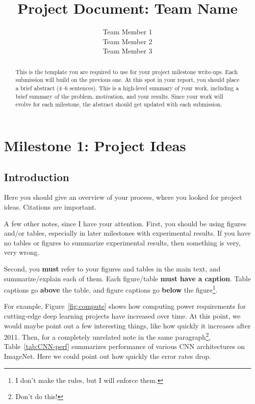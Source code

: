 \documentclass{report}
\title{Project Document: Team Name}
\author{Team Member 1 \\
Team Member 2 \\
Team Member 3 }
\date{}
\begin{document}
\maketitle

\tableofcontents

\begin{abstract}
This is the template you are required to use for your project milestone write-ups.  Each submission will build on the previous one.  At this spot in your report, you should place a brief abstract (4--6 sentences). This is a high-level summary of your work, including a brief summary of the problem, motivation, and your results.  Since your work will evolve for each milestone, the abstract should get updated with each submission.
\end{abstract}

\chapter{Milestone 1: Project Ideas}

\section{Introduction}

Here you should give an 
overview of your process, where you looked for project ideas. Citations are important. 

A few other notes, since I have your attention. First, you should be using figures and/or tables, especially in later milestones with experimental results.  If you have no tables or figures to summarize experimental results, then something is very, very wrong. 

Second, you {\bf must} refer to your figures and tables in the main text, and summarize/explain each of  them.  Each figure/table {\bf must have a caption}.  Table captions go {\bf above} the table, and figure captions go {\bf below} the figure\footnote{I don't make the rules, but I will enforce them.}. 

For example, Figure~\ref{fig:compute} shows how computing power requirements for cutting-edge deep learning projects have increased over time. At this point, we would maybe point out a few interesting things, like how quickly it increases after 2011. Then, for a completely unrelated note in the same paragraph\footnote{Don't do this!}, Table~\ref{tab:CNN-perf} summarizes  performance of various CNN architectures on ImageNet.  Here we could point out how quickly the error rates drop. 
\end{document}
